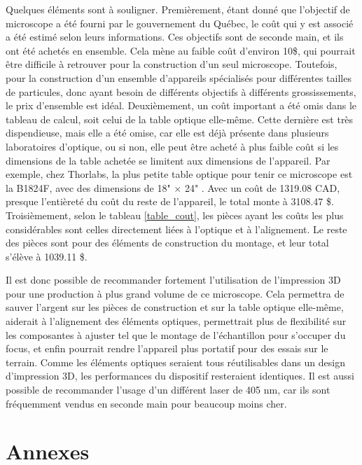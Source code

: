 \documentclass[11pt,letterpaper]{article}
\begin{document}
Quelques éléments sont à souligner. Premièrement, étant donné que l'objectif de microscope a
été fourni par le gouvernement du Québec, le coût qui y est associé a été estimé selon leurs
informations. Ces objectifs sont de seconde main, et ils ont été achetés en ensemble. Cela mène
au faible coût d'environ 10\$, qui pourrait être difficile à retrouver pour la construction d'un
seul microscope. Toutefois, pour la construction d'un ensemble d'appareils spécialisés pour
différentes tailles de particules, donc ayant besoin de différents objectifs à différents 
grossissements, le prix d'ensemble est idéal. Deuxièmement, un coût important a été omis dans 
le tableau de calcul, soit celui de la table optique elle-même. Cette dernière est très
dispendieuse, mais elle a été omise, car elle est déjà présente dans plusieurs laboratoires 
d'optique, ou si non, elle peut être acheté à plus faible coût si les dimensions de la table
achetée se limitent aux dimensions de l'appareil. Par exemple, chez Thorlabs, la plus petite 
table optique pour tenir ce microscope est la B1824F, avec des dimensions de 18" $\times$ 24" \cite{noauthor_thorlabs_2024}.
Avec un coût de 1319.08 CAD, presque l'entièreté du coût du reste de l'appareil, le total
monte à 3108.47 \$. Troisièmement, selon le tableau \ref{table_cout}, les pièces ayant les
coûts les plus considérables sont celles directement liées à l'optique et à l'alignement. Le
reste des pièces sont pour des éléments de construction du montage, et leur total s'élève à
1039.11 \$.

Il est donc possible de recommander fortement l'utilisation de l'impression 3D pour une production
à plus grand volume de ce microscope. Cela permettra de sauver l'argent sur les pièces de
construction et sur la table optique elle-même, aiderait à l'alignement des éléments optiques,
permettrait plus de flexibilité sur les composantes à ajuster tel que le montage de l'échantillon pour
s'occuper du focus, et enfin pourrait rendre l'appareil plus portatif pour des essais sur le terrain.
Comme les éléments optiques seraient tous réutilisables dans un design d'impression 3D, les
performances du dispositif resteraient identiques. Il est aussi possible de recommander l'usage
d'un différent laser de 405 nm, car ils sont fréquemment vendus en seconde main pour beaucoup moins
cher.




\section{Annexes}
\end{document}
